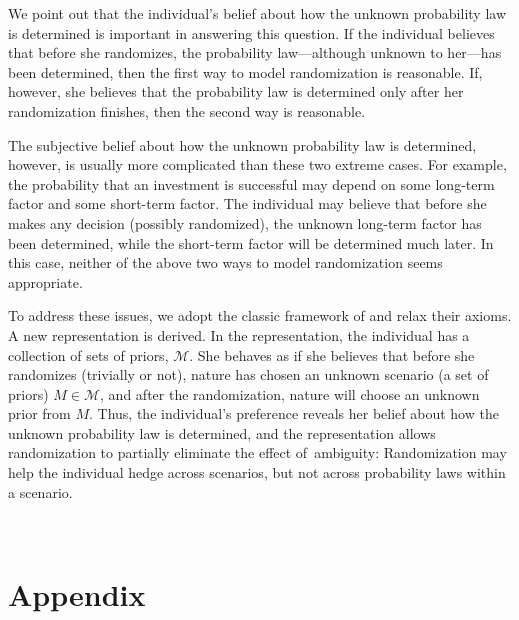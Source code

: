 \documentclass[12pt, notitlepage]{article}
\begin{document}
We point out that the individual's belief about how the unknown probability
law is determined is important in answering this question. If the individual
believes that before she randomizes, the probability law---although unknown
to her---has been determined, then the first way to model randomization is
reasonable. If, however, she believes that the probability law is determined
only after her randomization finishes, then the second way is reasonable.

The subjective belief about how the unknown probability law is determined,
however, is usually more complicated than these two extreme cases. For
example, the probability that an investment is successful may depend on some
long-term factor and some short-term factor. The individual may believe that
before she makes any decision (possibly randomized), the unknown long-term
factor has been determined, while the short-term factor will be determined
much later. In this case, neither of the above two ways to model
randomization seems appropriate.

To address these issues, we adopt the classic framework of \cite{AA63} and
relax their axioms. A new representation is derived. In the representation,
the individual has a collection of sets of priors, $\mathcal{M}$. She
behaves as if she believes that before she randomizes (trivially or not),
nature has chosen an unknown scenario (a set of priors) $M\in \mathcal{M}$,
and after the randomization, nature will choose an unknown prior from $M$.
Thus, the individual's preference reveals her belief about how the unknown
probability law is determined, and the representation allows randomization
to partially eliminate the effect of\ ambiguity: Randomization may help the
individual hedge across scenarios, but not across probability laws within a
scenario.\newpage

{ }

{\ 

{}
\pagebreak }

{\appendix
}

\section{Appendix}
\end{document}
